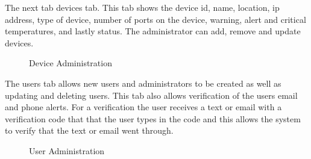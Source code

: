 \documentclass{report}
\begin{document}
\newpage
The next tab devices tab. This tab shows the device id, name, location, ip address, type of device, number of ports on the device, warning, alert and critical temperatures, and lastly status. The administrator can add, remove and update devices. 
\begin{figure}[H]
	\caption{Device Administration}
\end{figure}
\newpage
The users tab allows new users and administrators to be created as well as updating and deleting users. This tab also allows verification of the users email and phone alerts. For a verification the user receives a text or email with a verification code that that the user types in the code and this allows the system to verify that the text or email went through.
\begin{figure}[H]
	\caption{User Administration}
\end{figure}
\end{document}
